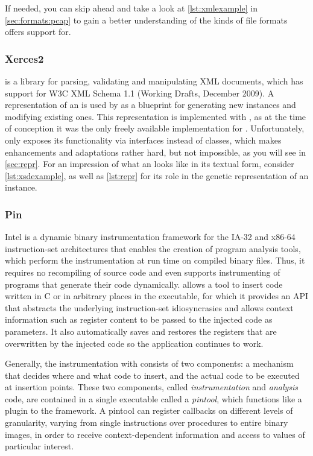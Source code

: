 If needed, you can skip ahead and take a look at \cref{lst:xmlexample} in \cref{sec:formats:pcap}
to gain a better understanding of the kinds of file formats \xom offers support for.
\tocless\subsubsection{Xerces2}
\xerces{}\cite{xerces} is a \java library for parsing, validating and manipulating XML documents, which has
support for W3C XML Schema 1.1 (Working Drafts, December 2009). A representation of an \xsd is used by \xmlmate
as a blueprint for generating new \xml instances and modifying existing ones. This representation is
implemented with \xerces, as at the time of conception it was the only freely available \xsd implementation
for \java. Unfortunately, \xerces only exposes its functionality via interfaces instead of classes, which
makes enhancements and adaptations rather hard, but not impossible, as you will see in \cref{sec:repr}.
For an impression of what an \xsd looks like in its textual form, consider \cref{lst:xsdexample},
as well as \cref{lst:repr} for its role in the genetic representation of an \xml instance.
\tocless\subsubsection{Pin}
{\small Intel} \pin\cite{Luk05pin:building} is a dynamic binary instrumentation framework for the IA-32 and x86-64 instruction-set architectures 
that enables the creation of program analysis tools, which perform the instrumentation at run time on  
compiled binary files. Thus, it requires no recompiling of source code and even supports instrumenting
of programs that generate their code dynamically.
\pin allows a tool to insert code written in C or \cpp in arbitrary places in the executable, for which it 
provides an API that abstracts the underlying instruction-set idiosyncrasies and allows
context information such as register content to be passed to the injected code as parameters. It also
automatically saves and restores the registers that are overwritten by the injected code so the application
continues to work.

Generally, the instrumentation with \pin consists of two components: a mechanism that decides where and what code to insert, 
and the actual code to be executed at insertion points. These two components, called \emph{instrumentation} and
\emph{analysis} code, are contained in a single executable called a \emph{pintool}, which functions like a
plugin to the \pin framework.
A pintool can register callbacks on different levels of granularity, varying from single instructions over procedures
to entire binary images, in order to receive context-dependent information and access to values of particular interest.

